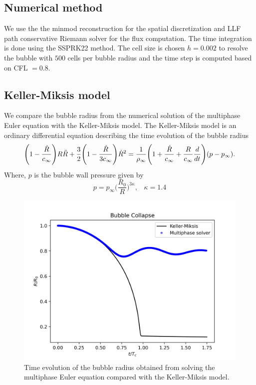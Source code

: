 \documentclass[a4paper]{article}
\begin{document}
\subsection*{Numerical method}
We use the the minmod reconstruction for the spatial discretization and LLF path conservative Riemann solver for the flux computation. The time integration is done using the SSPRK22 method. The cell size is chosen $h = 0.002$ to resolve the bubble with $500$ cells per bubble radius and the time step is computed based on CFL $= 0.8$.

\subsection*{Keller-Miksis model}
We compare the bubble radius from the numerical solution of the multiphase Euler equation with the Keller-Miksis model. The Keller-Miksis model is an ordinary differential equation describing the time evolution of the bubble radius
\begin{equation}
   \Bigg( 1 - \frac{\Dot{R}}{c_\infty} \Bigg)R \Ddot{R} + \frac{3}{2} \Bigg(1 - \frac{\Dot{R}}{3c_\infty} \Bigg)\Dot{R}^2 = \frac{1}{\rho_\infty} \Bigg( 1 + \frac{\Dot{R}}{c_\infty} + \frac{R}{c_\infty}\frac{d}{dt}\Bigg)(p - p_\infty).
\end{equation}
Where,  $p$ is the bubble wall pressure given by
\begin{equation}
    p = p_{\infty} \Bigg( \frac{R_0}{R} \Bigg)^{3 \kappa}, \;\;\; \kappa = 1.4 
\end{equation}
\begin{figure}[h!]
    \centering
    \includegraphics[scale=0.7]{images/kellermiksis.png}
    \caption{Time evolution of the bubble radius obtained from solving the multiphase Euler equation compared with the Keller-Miksis model.}
\end{figure}
\end{document}
